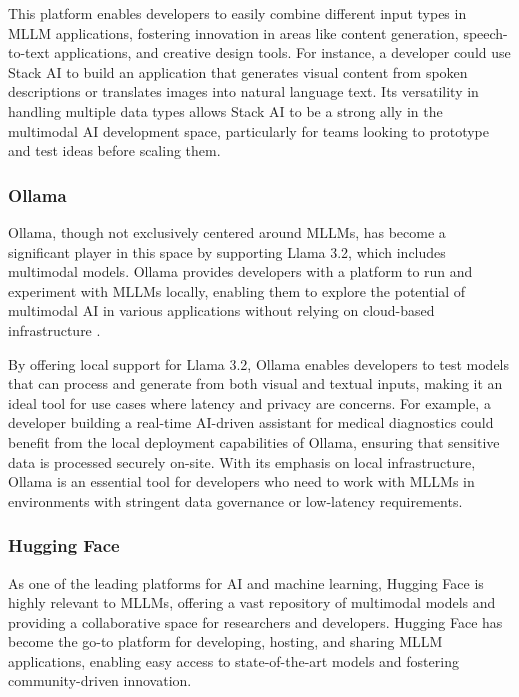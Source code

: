 This platform enables developers to easily combine different input types in MLLM applications, fostering innovation in areas like content generation, speech-to-text applications, and creative design tools. 
For instance, a developer could use Stack AI to build an application that generates visual content from spoken descriptions or translates images into natural language text. 
Its versatility in handling multiple data types allows Stack AI to be a strong ally in the multimodal AI development space, particularly for teams looking to prototype and test ideas before scaling them.

\subsubsection{Ollama}

Ollama, though not exclusively centered around MLLMs, has become a significant player in this space by supporting Llama 3.2, which includes multimodal models. 
Ollama provides developers with a platform to run and experiment with MLLMs locally, enabling them to explore the potential of multimodal AI in various applications without relying on cloud-based infrastructure \cite{vik2024large}.

By offering local support for Llama 3.2, Ollama enables developers to test models that can process and generate from both visual and textual inputs, making it an ideal tool for use cases where latency and privacy are concerns. 
For example, a developer building a real-time AI-driven assistant for medical diagnostics could benefit from the local deployment capabilities of Ollama, ensuring that sensitive data is processed securely on-site. 
With its emphasis on local infrastructure, Ollama is an essential tool for developers who need to work with MLLMs in environments with stringent data governance or low-latency requirements.

\subsubsection{Hugging Face}

As one of the leading platforms for AI and machine learning, Hugging Face \cite{jain2022hugging} is highly relevant to MLLMs, offering a vast repository of multimodal models and providing a collaborative space for researchers and developers. 
Hugging Face has become the go-to platform for developing, hosting, and sharing MLLM applications, enabling easy access to state-of-the-art models and fostering community-driven innovation.

